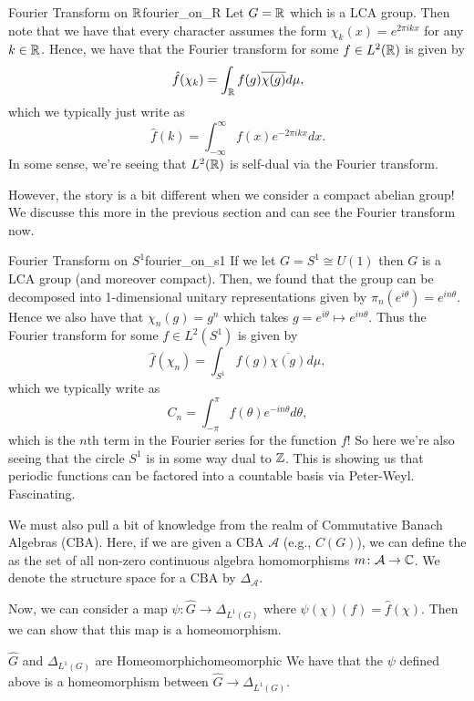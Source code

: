 \begin{ex}{Fourier Transform on $\mathbb{R}$}{fourier_on_R}
    Let $G=\mathbb{R}$ which is a LCA group.  Then note that we have that every character assumes the form $\chi_k(x)=e^{2\pi i kx}$ for any $k\in \mathbb{R}$. Hence, we have that the Fourier transform for some $f\in L^2(\mathbb{R})$ is given by
    \[
    \hat{f}(\chi_k)=\int_{\mathbb{R}} f(g)\overline{\chi(g)}d\mu,
    \]
    which we typically just write as
    \[
    \hat{f}(k)=\int_{-\infty}^\infty f(x)e^{-2\pi i kx}dx.
    \]
    In some sense, we're seeing that $L^2(\mathbb{R})$ is self-dual via the Fourier transform.
\end{ex}

However, the story is a bit different when we consider a compact abelian group! We discusse this more in the previous section and can see the Fourier transform now.

\begin{ex}{Fourier Transform on $S^1$}{fourier_on_s1}
    If we let $G=S^1\cong U(1)$ then $G$ is a LCA group (and moreover compact).  Then, we found that the group can be decomposed into 1-dimensional unitary representations given by $\pi_n(e^{i\theta})=e^{in\theta}$. Hence we also have that $\chi_n(g)=g^n$ which takes $g=e^{i\theta}\mapsto e^{in\theta}$. Thus the Fourier transform for some $f\in L^2(S^1)$ is given by
    \[
    \hat{f}(\chi_n)=\int_{S^1} f(g)\overline{\chi(g)}d\mu,
    \]
    which we typically write as
    \[
    C_n = \int_{-\pi}^\pi f(\theta) e^{-in\theta} d\theta,
    \]
    which is the $n$th term in the Fourier series for the function $f$! So here we're also seeing that the circle $S^1$ is in some way dual to $\mathbb{Z}$. This is showing us that periodic functions can be factored into a countable basis via Peter-Weyl. Fascinating.
\end{ex}

We must also pull a bit of knowledge from the realm of Commutative Banach Algebras (CBA). Here, if we are given a CBA $\mathcal{A}$ (e.g., $C(G)$), we can define the  as the set of all non-zero continuous algebra homomorphisms $m\colon \mathcal{A}\to \mathbb{C}$. We denote the structure space for a CBA by $\Delta_\mathcal{A}$. 

Now, we can consider a map $\psi\colon \hat{G}\to \Delta_{L^1(G)}$ where $\psi(\chi)(f)=\hat{f}(\chi).$ Then we can show that this map is a homeomorphism.

\begin{thm}{$\hat{G}$ and $\Delta_{L^1(G)}$ are Homeomorphic}{homeomorphic}
We have that the $\psi$ defined above is a homeomorphism between $\hat{G}\to \Delta_{L^1(G)}$.
\end{thm}

